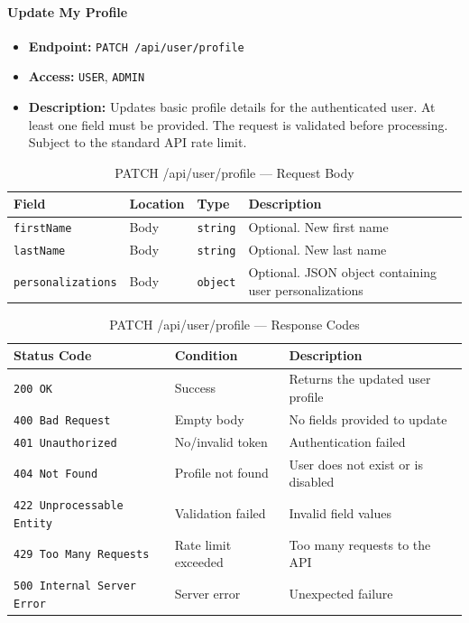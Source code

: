 \paragraph{Update My Profile}
\label{subsubsec:update-my-profile}

\begin{itemize}
  \item \textbf{Endpoint:} \texttt{PATCH /api/user/profile}
  \item \textbf{Access:} \texttt{USER}, \texttt{ADMIN}
  \item \textbf{Description:} Updates basic profile details for the authenticated user. At least one field must be provided. The request is validated before processing. Subject to the standard API rate limit.
\end{itemize}

\begin{table}[H]
\centering
\renewcommand{\arraystretch}{1.3}
\begin{tabularx}{\textwidth}{|l|l|l|X|}
\hline
\textbf{Field} & \textbf{Location} & \textbf{Type} & \textbf{Description} \\
\hline
\texttt{firstName}        & Body & \texttt{string}  & Optional. New first name \\
\hline
\texttt{lastName}         & Body & \texttt{string}  & Optional. New last name \\
\hline
\texttt{personalizations} & Body & \texttt{object}  & Optional. JSON object containing user personalizations \\
\hline
\end{tabularx}
\caption{PATCH /api/user/profile — Request Body}
\label{tab:update-my-profile-body}
\end{table}

\begin{table}[H]
\centering
\renewcommand{\arraystretch}{1.3}
\begin{tabularx}{\textwidth}{|l|l|X|}
\hline
\textbf{Status Code} & \textbf{Condition} & \textbf{Description} \\
\hline
\texttt{200 OK}           & Success              & Returns the updated user profile \\
\hline
\texttt{400 Bad Request}  & Empty body           & No fields provided to update \\
\hline
\texttt{401 Unauthorized} & No/invalid token     & Authentication failed \\
\hline
\texttt{404 Not Found}    & Profile not found    & User does not exist or is disabled \\
\hline
\texttt{422 Unprocessable Entity} & Validation failed & Invalid field values \\
\hline
\texttt{429 Too Many Requests} & Rate limit exceeded & Too many requests to the API \\
\hline
\texttt{500 Internal Server Error} & Server error & Unexpected failure \\
\hline
\end{tabularx}
\caption{PATCH /api/user/profile — Response Codes}
\label{tab:update-my-profile-responses}
\end{table}
\FloatBarrier

